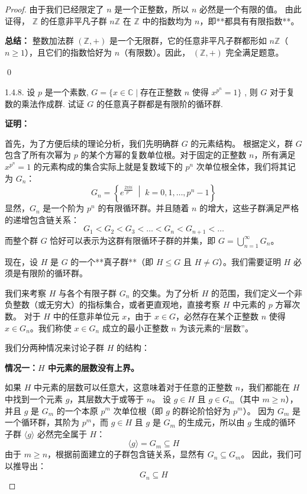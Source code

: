 \documentclass[]{article}
\begin{document}
\begin{proof}
由于我们已经限定了 $n$ 是一个正整数，所以 $n$ 必然是一个有限的值。
由此证得， $\mathbb{Z}$ 的任意非平凡子群 $n\mathbb{Z}$ 在 $\mathbb{Z}$ 中的指数均为 $n$，即**都具有有限指数**。

\bigskip
\noindent \textbf{总结：} 
整数加法群 $(\mathbb{Z}, +)$ 是一个无限群，它的任意非平凡子群都形如 $n\mathbb{Z}$（$n \ge 1$），且它们的指数恰好为 $n$（有限数）。因此， $(\mathbb{Z}, +)$ 完全满足题意。

\qed

1.4.8. 设 $p$ 是一个素数, $G = \{x \in \mathbb{C} \mid \text{存在正整数 } n \text{ 使得 } x^{p^n} = 1\}$ , 则 $G$ 对于复数的乘法作成群. 试证 $G$ 的任意真子群都是有限阶的循环群. 

\bigskip
\noindent \textbf{证明：} 

首先，为了方便后续的理论分析，我们先明确群 $G$ 的元素结构。
根据定义，群 $G$ 包含了所有次幂为 $p$ 的某个方幂的复数单位根。对于固定的正整数 $n$，所有满足 $x^{p^n} = 1$ 的元素构成的集合实际上就是复数域下的 $p^n$ 次单位根全体，我们将其记为 $G_n$：
\[ G_n = \left\{ e^{ \frac{2\pi k i}{p^n} } \;\middle|\; k = 0, 1, \dots, p^n - 1 \right\} \]
显然，$G_n$ 是一个阶为 $p^n$ 的有限循环群。并且随着 $n$ 的增大，这些子群满足严格的递增包含链关系：
\[ G_1 < G_2 < G_3 < \dots < G_n < G_{n+1} < \dots \]
而整个群 $G$ 恰好可以表示为这群有限循环子群的并集，即 $G = \bigcup_{n=1}^{\infty} G_n$。

现在，设 $H$ 是 $G$ 的一个**真子群**（即 $H \leqslant G$ 且 $H \neq G$）。我们需要证明 $H$ 必须是有限阶的循环群。

\bigskip
我们来考察 $H$ 与各个有限子群 $G_n$ 的交集。为了分析 $H$ 的范围，我们定义一个非负整数（或无穷大）的指标集合，或者更直观地，直接考察 $H$ 中元素的 $p$ 方幂次数。
对于 $H$ 中的任意非单位元 $x$，由于 $x \in G$，必然存在某个正整数 $n$ 使得 $x \in G_n$。我们称使 $x \in G_n$ 成立的最小正整数 $n$ 为该元素的“层数”。

我们分两种情况来讨论子群 $H$ 的结构：

\medskip
\noindent \textbf{情况一：$H$ 中元素的层数没有上界。}

如果 $H$ 中元素的层数可以任意大，这意味着对于任意的正整数 $n$，我们都能在 $H$ 中找到一个元素 $g$，其层数大于或等于 $n$。
设 $g \in H$ 且 $g \in G_m$（其中 $m \ge n$），并且 $g$ 是 $G_m$ 的一个本原 $p^m$ 次单位根（即 $g$ 的群论阶恰好为 $p^m$）。
因为 $G_m$ 是一个循环群，其阶为 $p^m$，而 $g \in H$ 且 $g$ 是 $G_m$ 的生成元，所以由 $g$ 生成的循环子群 $\langle g \rangle$ 必然完全属于 $H$：
\[ \langle g \rangle = G_m \subseteq H \]
由于 $m \ge n$，根据前面建立的子群包含链关系，显然有 $G_n \subseteq G_m$。
因此，我们可以推导出：
\[ G_n \subseteq H \]


\end{proof}
\end{document}
